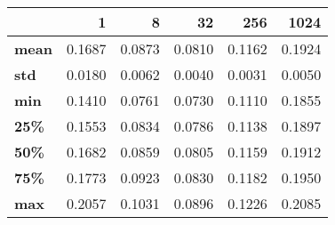 \begin{tabular}{lrrrrr}
\toprule
{} &       1 &       8 &      32 &     256 &    1024 \\
\midrule
\textbf{mean} &  0.1687 &  0.0873 &  0.0810 &  0.1162 &  0.1924 \\
\textbf{std } &  0.0180 &  0.0062 &  0.0040 &  0.0031 &  0.0050 \\
\textbf{min } &  0.1410 &  0.0761 &  0.0730 &  0.1110 &  0.1855 \\
\textbf{25\% } &  0.1553 &  0.0834 &  0.0786 &  0.1138 &  0.1897 \\
\textbf{50\% } &  0.1682 &  0.0859 &  0.0805 &  0.1159 &  0.1912 \\
\textbf{75\% } &  0.1773 &  0.0923 &  0.0830 &  0.1182 &  0.1950 \\
\textbf{max } &  0.2057 &  0.1031 &  0.0896 &  0.1226 &  0.2085 \\
\bottomrule
\end{tabular}
